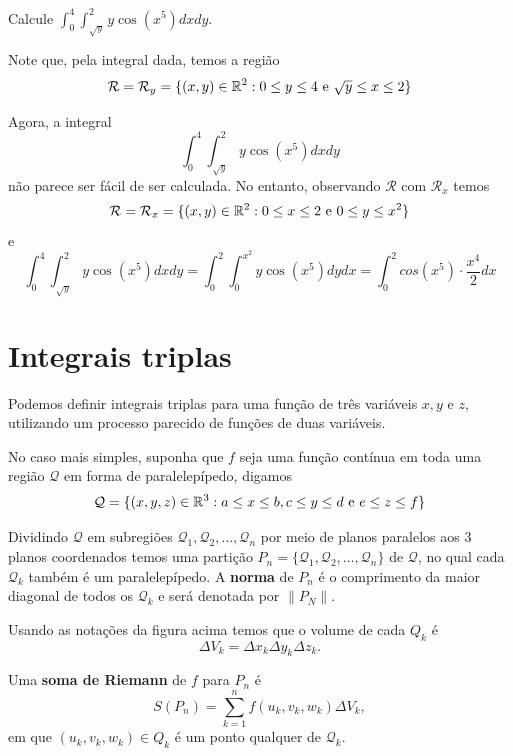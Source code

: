 \begin{example}
    Calcule \(\int_0^4 \int_{\sqrt{y}}^{2} y\cos(x^5) dxdy\).

    Note que, pela integral dada, temos a região \[\mathcal{R} = \mathcal{R}_y = \{(x,y)\in\mathbb{R}^2 : 0\leq y\leq 4 \text{ e } \sqrt{y}\leq x\leq 2\}\]

    Agora, a integral \[\int_0^4 \int_{\sqrt{y}}^{2} y\cos(x^5) dxdy\] não parece ser fácil de ser calculada. No entanto, observando \(\mathcal{R}\) com \(\mathcal{R}_x\) temos \[\mathcal{R} = \mathcal{R}_x = \{(x,y)\in\mathbb{R}^2 : 0\leq x\leq 2 \text{ e } 0\leq y\leq x^2 \}\] e \[\int_0^4 \int_{\sqrt{y}}^2 y\cos(x^5) dxdy = \int_0^2 \int_0^{x^2} y \cos(x^5) dy dx = \int_0^2 cos(x^5)\cdot \frac{x^4}{2} dx\]
\end{example}





\section{Integrais triplas}

Podemos definir integrais triplas para uma função de três variáveis \(x, y\) e \(z\), utilizando um processo parecido de funções de duas variáveis.

No caso mais simples, suponha que \(f\) seja uma função contínua em toda uma região \(\mathcal{Q}\) em forma de paralelepípedo, digamos \[\mathcal{Q} = \{(x,y,z)\in\mathbb{R}^3 : a\leq x \leq b, c\leq y\leq d \text{ e } e\leq z\leq f\}\]

Dividindo \(\mathcal{Q}\) em subregiões \(\mathcal{Q}_1, \mathcal{Q}_2,\dots,\mathcal{Q}_n\) por meio de planos paralelos aos 3 planos coordenados temos uma partição \(P_n = \{\mathcal{Q}_1, \mathcal{Q}_2,\dots, \mathcal{Q}_n\}\) de \(\mathcal{Q}\), no qual cada \(\mathcal{Q}_k\) também é um paralelepípedo. A \textbf{norma} de \(P_n\) é o comprimento da maior diagonal de todos os \(\mathcal{Q}_k\) e será denotada por \(\|P_N\|\).

Usando as notações da figura acima temos que o volume de cada \(Q_k\) é \[\Delta V_k = \Delta x_k \Delta y_k \Delta z_k.\]

Uma \textbf{soma de Riemann} de \(f\) para \(P_n\) é \[S(P_n) = \sum_{k=1}^{n} f(u_k, v_k, w_k) \Delta V_k, \] em que \((u_k,v_k,w_k)\in Q_k\) é um ponto qualquer de \(\mathcal{Q}_k\).

